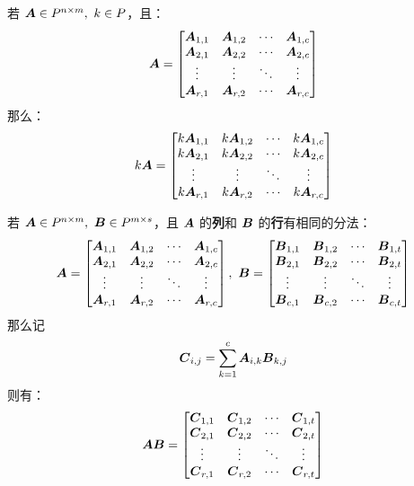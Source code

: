 \begin{definition}[分块矩阵的数乘]
	若 $\boldsymbol{A} \in P^{n \times m},\ k \in P$，且：
	$$
	\boldsymbol{A} = \begin{bmatrix}
		\boldsymbol{A}_{1,1} & \boldsymbol{A}_{1,2} & \cdots & \boldsymbol{A}_{1,c} \\
		\boldsymbol{A}_{2,1} & \boldsymbol{A}_{2,2} & \cdots & \boldsymbol{A}_{2,c} \\
		\vdots & \vdots & \ddots & \vdots \\
		\boldsymbol{A}_{r,1} & \boldsymbol{A}_{r,2} & \cdots & \boldsymbol{A}_{r,c}
	\end{bmatrix}
	$$
	那么：
	$$
	k \boldsymbol{A} = \begin{bmatrix}
		k \boldsymbol{A}_{1,1} & k \boldsymbol{A}_{1,2} & \cdots & k \boldsymbol{A}_{1,c} \\
		k \boldsymbol{A}_{2,1} & k \boldsymbol{A}_{2,2} & \cdots & k \boldsymbol{A}_{2,c} \\
		\vdots & \vdots & \ddots & \vdots \\
		k \boldsymbol{A}_{r,1} & k \boldsymbol{A}_{r,2} & \cdots & k \boldsymbol{A}_{r,c}
	\end{bmatrix}
	$$
\end{definition}

\begin{definition}[分块矩阵的乘法]
	若 $\boldsymbol{A} \in P^{n \times m},\ \boldsymbol{B} \in P^{m \times s}$，且 $\boldsymbol{A}$ 的\textbf{列}和 $\boldsymbol{B}$ 的\textbf{行}有相同的分法：
	$$
	\matr{A} = \begin{bmatrix}
		\matr{A}_{1,1} & \matr{A}_{1,2} & \cdots & \matr{A}_{1,c} \\
		\matr{A}_{2,1} & \matr{A}_{2,2} & \cdots & \matr{A}_{2,c} \\
		\vdots & \vdots & \ddots & \vdots \\
		\matr{A}_{r,1} & \matr{A}_{r,2} & \cdots & \matr{A}_{r,c}
	\end{bmatrix},\ 
	\matr{B} = \begin{bmatrix}
		\matr{B}_{1,1} & \matr{B}_{1,2} & \cdots & \matr{B}_{1,t} \\
		\matr{B}_{2,1} & \matr{B}_{2,2} & \cdots & \matr{B}_{2,t} \\
		\vdots & \vdots & \ddots & \vdots \\
		\matr{B}_{c,1} & \matr{B}_{c,2} & \cdots & \matr{B}_{c,t}
	\end{bmatrix}
	$$
	那么记
	$$
	\boldsymbol{C}_{i,j} = \sum_{k=1}^c \boldsymbol{A}_{i,k} \boldsymbol{B}_{k,j}
	$$
	则有：
	$$
	\boldsymbol{A} \boldsymbol{B} = \begin{bmatrix}
		\boldsymbol{C}_{1,1} & \boldsymbol{C}_{1,2} & \cdots & \boldsymbol{C}_{1,t} \\
		\boldsymbol{C}_{2,1} & \boldsymbol{C}_{2,2} & \cdots & \boldsymbol{C}_{2,t} \\
		\vdots & \vdots & \ddots & \vdots \\
		\boldsymbol{C}_{r,1} & \boldsymbol{C}_{r,2} & \cdots & \boldsymbol{C}_{r,t}
	\end{bmatrix}
	$$
\end{definition}

